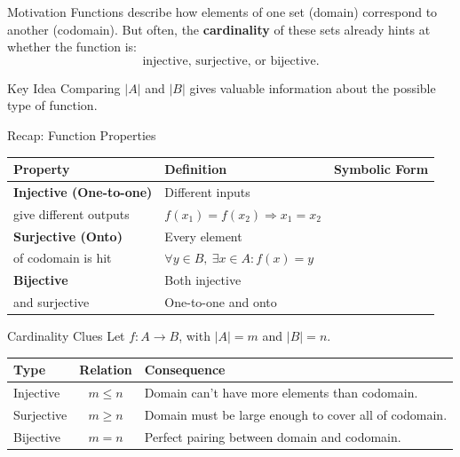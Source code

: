\documentclass[11pt]{beamer}
\theoremstyle{plain}
\begin{document}





\begin{frame}{Motivation}
Functions describe how elements of one set (domain) correspond to another (codomain).  
But often, the \textbf{cardinality} of these sets already hints at whether the function is:
\[
\text{injective, surjective, or bijective.}
\]
\pause
\begin{block}{Key Idea}
Comparing $|A|$ and $|B|$ gives valuable information about the possible type of function.
\end{block}
\end{frame}

\begin{frame}{Recap: Function Properties}
\begin{table}[h!]
\centering
\renewcommand{\arraystretch}{1.3}
\begin{tabular}{|l|l|l|}
\hline
\textbf{Property} & \textbf{Definition} & \textbf{Symbolic Form} \\ \hline
\textbf{Injective (One-to-one)} & Different inputs\\ give different outputs & $f(x_1)=f(x_2)\Rightarrow x_1=x_2$ \\ \hline
\textbf{Surjective (Onto)} & Every element\\ of codomain is hit & $\forall y\in B,\ \exists x\in A: f(x)=y$ \\ \hline
\textbf{Bijective} & Both injective\\ and surjective & One-to-one and onto \\ \hline
\end{tabular}
\end{table}
\end{frame}

\begin{frame}{Cardinality Clues}
Let $f:A\to B$, with $|A|=m$ and $|B|=n$.

\begin{table}[h!]
\centering
\renewcommand{\arraystretch}{1.3}
\begin{tabular}{|l|c|l|}
\hline
\textbf{Type} & \textbf{Relation} & \textbf{Consequence} \\ \hline
Injective & $m\le n$ & Domain can't have more elements than codomain. \\ \hline
Surjective & $m\ge n$ & Domain must be large enough to cover all of codomain. \\ \hline
Bijective & $m=n$ & Perfect pairing between domain and codomain. \\ \hline
\end{tabular}
\end{table}
\end{frame}
\end{document}
